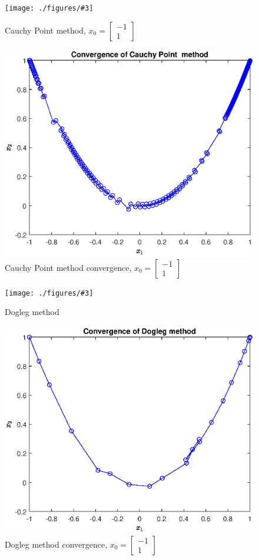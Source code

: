 \documentclass[unicode,11pt,a4paper,oneside,numbers=endperiod,openany]{scrartcl}
\newcommand{\myvec}[1]{\begin{bmatrix} #1 \end{bmatrix}}
\newcommand{\myFigureEnergy}[3]{
    \begin{figure}[htbp]
    \centering
    \caption{#1}
    \label{#2}
    \texttt{[image: ./figures/\#3]}
    \end{figure}
}
\begin{document}
\myFigureEnergy{Cauchy Point method, $x_0 = \myvec{-1 \\ 1}$}{ex1-4-n1n1-cauchy-energy}{ex1-4-n1n1-cauchy-energy.eps}
\begin{figure}[htbp]
\centering
\caption{Cauchy Point method convergence, $x_0 = \myvec{-1 \\ 1}$}
\label{ex1-4-n1n1-cauchy-convergence}
\includegraphics[width=\textwidth, trim={0cm 0cm 0cm 0cm}]{./figures/ex1-4-n1n1-cauchy-convergence.eps}
\end{figure}


\myFigureEnergy{Dogleg method}{ex1-4-n1n1-dogleg-energy}{ex1-4-n1n1-dogleg-energy.eps}
\begin{figure}[htbp]
\centering
\caption{Dogleg method convergence, $x_0 = \myvec{-1 \\ 1}$}
\label{ex1-4-n1n1-dogleg-convergence}
\includegraphics[width=\textwidth, trim={0cm 0cm 0cm 0cm}]{./figures/ex1-4-n1n1-dogleg-convergence.eps}
\end{figure}
\end{document}
